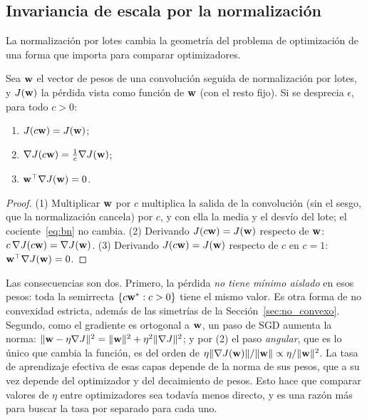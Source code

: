 \subsection{Invariancia de escala por la normalización}
\label{sec:bn_escala}

La normalización por lotes cambia la geometría del problema de optimización de una forma que importa para comparar
optimizadores.

\begin{proposicion}
\label{prop:bn_escala}
Sea $\mathbf{w}$ el vector de pesos de una convolución seguida de normalización por lotes, y $J(\mathbf{w})$ la pérdida vista como
función de $\mathbf{w}$ (con el resto fijo). Si se desprecia $\epsilon$, para todo $c > 0$:
\begin{enumerate}
  \item $J(c\mathbf{w}) = J(\mathbf{w})$;
  \item $\nabla J(c\mathbf{w}) = \frac{1}{c}\nabla J(\mathbf{w})$;
  \item $\mathbf{w}^\top\nabla J(\mathbf{w}) = 0$.
\end{enumerate}
\end{proposicion}
\begin{proof}
(1) Multiplicar $\mathbf{w}$ por $c$ multiplica la salida de la convolución (sin el sesgo, que la normalización cancela) por $c$, y
con ella la media y el desvío del lote; el cociente~\eqref{eq:bn} no cambia. (2) Derivando $J(c\mathbf{w}) = J(\mathbf{w})$ respecto de
$\mathbf{w}$: $c\,\nabla J(c\mathbf{w}) = \nabla J(\mathbf{w})$. (3) Derivando $J(c\mathbf{w}) = J(\mathbf{w})$ respecto de $c$ en $c = 1$:
$\mathbf{w}^\top\nabla J(\mathbf{w}) = 0$.
\end{proof}

Las consecuencias son dos. Primero, la pérdida \emph{no tiene mínimo aislado} en esos pesos: toda la semirrecta
$\{c\mathbf{w}^* : c > 0\}$ tiene el mismo valor. Es otra forma de no convexidad estricta, además de las simetrías de la
Sección~\ref{sec:no_convexo}. Segundo, como el gradiente es ortogonal a $\mathbf{w}$, un paso de SGD aumenta la norma:
$\lVert\mathbf{w} - \eta\nabla J\rVert^2 = \lVert\mathbf{w}\rVert^2 + \eta^2\lVert\nabla J\rVert^2$; y por (2) el paso \emph{angular}, que es lo
único que cambia la función, es del orden de $\eta\lVert\nabla J(\mathbf{w})\rVert/\lVert\mathbf{w}\rVert \propto \eta/\lVert\mathbf{w}\rVert^2$. La tasa de
aprendizaje efectiva de esas capas depende de la norma de sus pesos, que a su vez depende del optimizador y del decaimiento
de pesos. Esto hace que comparar valores de $\eta$ entre optimizadores sea todavía menos directo, y es una razón más para
buscar la tasa por separado para cada uno.

